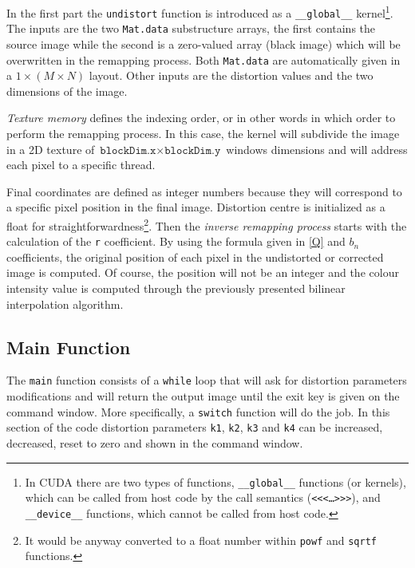 \documentclass[12pt]{article}
\newcommand*{\Cuda}{\textsc{CUDA}}
\begin{document}
%
In the first part the \texttt{undistort} function is introduced as a \texttt{\_\_global\_\_} kernel\footnote{ In \Cuda{} there are two types of functions, \texttt{\_\_global\_\_} functions (or kernels), which can be called from host code by the call semantics (\texttt{<<<\dots>>>}), and \texttt{\_\_device\_\_} functions, which cannot be called from host code.}. The inputs are the two \texttt{Mat.data} substructure arrays, the first contains the source image while the second is a zero-valued array (black image) which will be overwritten in the remapping process. Both \texttt{Mat.data} are automatically given in a $1 \times (M \times N)$ layout. Other inputs are the distortion values and the two dimensions of the image.

\textit{Texture memory} defines the indexing order, or in other words in which order to perform the remapping process. In this case, the kernel will subdivide the image in a 2D texture of $\texttt{blockDim.x}\times\texttt{blockDim.y}$ windows dimensions and will address each pixel to a specific thread.

Final coordinates are defined as integer numbers because they will correspond to a specific pixel position in the final image. Distortion centre is initialized as a float for straightforwardness\footnote{ It would be anyway converted to a float number within \texttt{powf} and \texttt{sqrtf} functions.}. Then the \textit{inverse remapping process} starts with the calculation of the \texttt{r} coefficient. By using the formula given in \eqref{Q} and $b_n$ coefficients, the original position of each pixel in the undistorted or corrected image is computed. Of course, the position will not be an integer and the colour intensity value is computed through the previously presented bilinear interpolation algorithm.
%
\subsection{Main Function}
%
The \texttt{main} function consists of a \texttt{while} loop that will ask for distortion parameters modifications and will return the output image until the exit key is given on the command window. More specifically, a \texttt{switch} function will do the job. In this section of the code distortion parameters \texttt{k1}, \texttt{k2}, \texttt{k3} and \texttt{k4} can be increased, decreased, reset to zero and shown in the command window.
%
\end{document}
